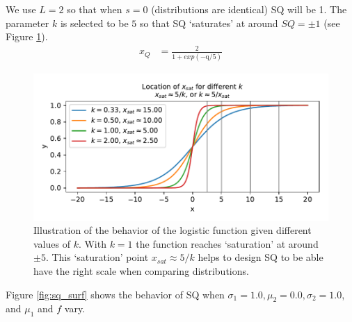 We use $L=2$ so that when $s=0$ (distributions are identical) SQ will be 1. The parameter $k$ is selected to be $5$ so that SQ `saturates' at around $SQ=\pm1$ (see Figure \ref{fig:log_sat}).
\begin{align}
    x_{Q} &= \frac{2}{1+exp(-\text{q}/5)}\label{eq:SQ}
\end{align}
\begin{figure}[tbp]
    \centering
    \includegraphics[width=0.9\linewidth]{Figures/logistic_saturation}
    \caption{Illustration of the behavior of the logistic function given different values of $k$. With $k=1$ the function reaches `saturation' at around $\pm5$. This `saturation' point $x_{sat}\approx 5/k$ helps to design SQ to be able have the right scale when comparing distributions.}
    \label{fig:log_sat}
\end{figure}

Figure \ref{fig:sq_surf} shows the behavior of SQ when $\sigma_1=1.0,\mu_2=0.0,\sigma_2=1.0$, and $\mu_1$ and $f$ vary.

